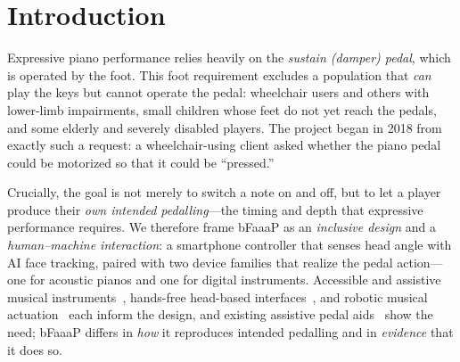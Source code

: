 
\section{Introduction}
\label{sec:intro}
Expressive piano performance relies heavily on the \emph{sustain (damper) pedal},
which is operated by the foot. This foot requirement excludes a population that
\emph{can} play the keys but cannot operate the pedal: wheelchair users and others
with lower-limb impairments, small children whose feet do not yet reach the
pedals, and some elderly and severely disabled players. The project began in 2018
from exactly such a request: a wheelchair-using client asked whether the piano
pedal could be motorized so that it could be ``pressed.''

Crucially, the goal is not merely to switch a note on and off, but to let a player
produce their \emph{own intended pedalling}---the timing and depth that expressive
performance requires. We therefore frame bFaaaP as an \emph{inclusive design} and
a \emph{human--machine interaction}: a smartphone controller that senses head
angle with AI face tracking, paired with two device families that realize the
pedal action---one for acoustic pianos and one for digital instruments. Accessible
and assistive musical instruments~\cite{frid2019,ramirez2023,duarte2023,eyeharp},
hands-free head-based interfaces~\cite{sumak2019,varona2008,manresa2014,arkit}, and
robotic musical actuation~\cite{weinberg2020,scimeca2020,zappi2012} each inform the
design, and existing assistive pedal aids~\cite{canassist,steingraeber,mouthpedal2008}
show the need; bFaaaP differs in \emph{how} it reproduces intended pedalling and in
\emph{evidence} that it does so.

